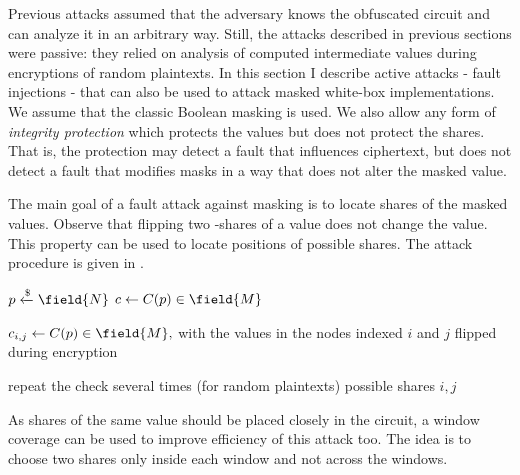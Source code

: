 
Previous attacks assumed that the adversary knows the obfuscated circuit and can analyze it in an arbitrary way. Still, the attacks described in previous sections were passive: they relied on analysis of computed intermediate values during encryptions of random plaintexts. In this section I describe active attacks - fault injections - that can also be used to attack masked white-box implementations. We assume that the classic Boolean masking is used. We also allow any form of \emph{integrity protection} which protects the values but does not protect the shares. That is, the protection may detect a fault that influences ciphertext, but does not detect a fault that modifies masks in a way that does not alter the masked value.



The main goal of a fault attack against masking is to locate shares of the masked values. Observe that flipping two \txor{}-shares of a value does not change the value. This property can be used to locate positions of possible shares. The attack procedure is given in .

\begin{algorithm}[ht]

\begin{algorithmic}[1]
    \State $p \xleftarrow{\$} \field{N}$
    \State $c \gets C(p) \in \field{M}$
    
        \State $c_{i,j} \gets C(p) \in \field{M},$ with the values in the nodes indexed $i$ and $j$
        \Statex \hspace{0.5cm} flipped during encryption

            \State repeat the check several times (for random plaintexts)
            \State \Return \textsf{possible shares $i, j$}
        \EndIf
    \EndFor
\end{algorithmic}
\end{algorithm}

\begin{remark}
As shares of the same value should be placed closely in the circuit, a window coverage can be used to improve efficiency of this attack too. The idea is to choose two shares only inside each window and not across the windows.
\end{remark}

